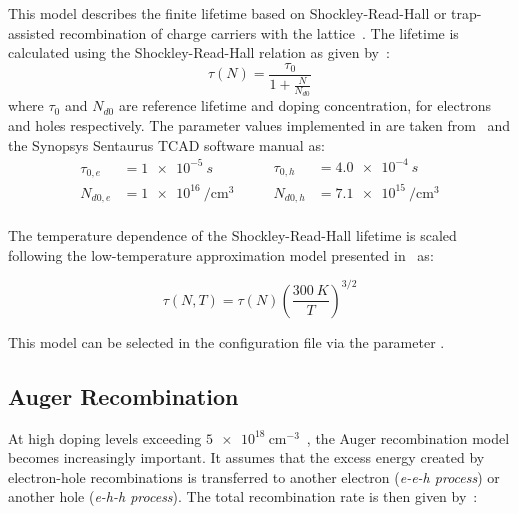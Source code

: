 This model describes the finite lifetime based on Shockley-Read-Hall or trap-assisted recombination of charge carriers with the lattice~\cite{shockley-read,hall}.
The lifetime is calculated using the Shockley-Read-Hall relation as given by~\cite{fossum-lee}:
\begin{equation}
    \tau(N) = \frac{\tau_0}{1 + \frac{N}{N_{d0}}}
\end{equation}
where $\tau_0$ and $N_{d0}$ are reference lifetime and doping concentration, for electrons and holes respectively.
The parameter values implemented in \apsq are taken from~\cite{fossum-lee} and the Synopsys Sentaurus TCAD software manual as:
\begin{equation*}
    \begin{split}
        \tau_{0,e} &= \SI{1e-5}{s} \\
        N_{d0,e}   &= \SI{1e16}{\per \cubic \cm} \\
    \end{split}
    \qquad
    \begin{split}
        \tau_{0,h} &= \SI{4.0e-4}{s} \\
        N_{d0,h}   &= \SI{7.1e15}{\per \cubic \cm} \\
    \end{split}
\end{equation*}

The temperature dependence of the Shockley-Read-Hall lifetime is scaled following the low-temperature approximation model presented in~\cite{schenk} as:

\begin{equation}
    \tau(N, T) = \tau(N) \left( \frac{\SI{300}{K}}{T} \right)^{3/2}
\end{equation}

This model can be selected in the configuration file via the parameter .

\subsection{Auger Recombination}

At high doping levels exceeding $\SI{5e18}{\centi\metre^{-3}}$~\cite{FOSSUM1983569}, the Auger recombination model becomes increasingly important.
It assumes that the excess energy created by electron-hole recombinations is transferred to another electron (\textit{e-e-h process}) or another hole (\textit{e-h-h process}).
The total recombination rate is then given by~\cite{kerr}:

